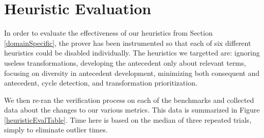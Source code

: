 \FloatBarrier
\section{Heuristic Evaluation\label{heuristicsEval}}
In order to evaluate the effectiveness of our heuristics from Section \ref{domainSpecific}, the prover has been instrumented so that each of six different heuristics could be disabled individually.  The heuristics we targetted are: ignoring useless transformations, developing the antecedent only about relevant terms, focusing on diversity in antecedent development, minimizing both consequent and antecedent, cycle detection, and transformation prioritization.

We then re-ran the verification process on each of the benchmarks and collected data about the changes to our various metrics.  This data is summarized in Figure \ref{heuristicEvalTable}.  Time here is based on the median of three repeated trials, simply to eliminate outlier times.

